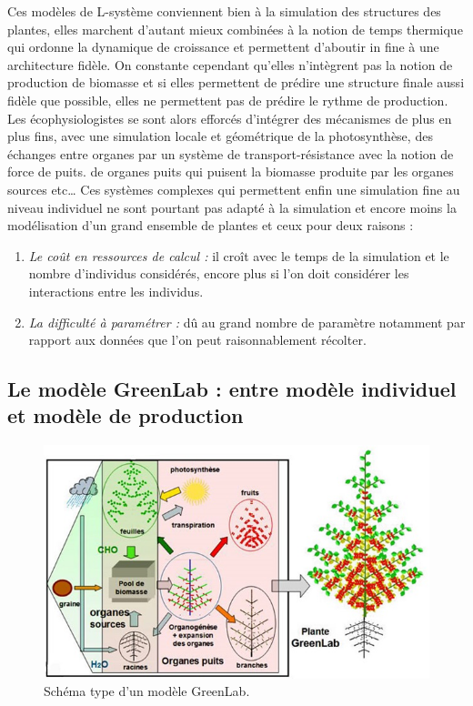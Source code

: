 {Ces modèles de L-système conviennent bien à la simulation des structures des
plantes, elles marchent d’autant mieux combinées à la notion de temps
thermique qui ordonne la dynamique de croissance et permettent d’aboutir 
in fine à une architecture fidèle. On constante cependant
qu'elles n’intègrent pas la notion de
production de biomasse et si elles permettent de prédire une structure
finale aussi fidèle que possible, elles ne permettent pas de prédire le
rythme de production. Les écophysiologistes se sont alors efforcés
d’intégrer des mécanismes de plus en plus fins, avec une simulation locale
et géométrique de la photosynthèse, des échanges entre organes par un
système de transport-résistance avec la notion de force de puits. de organes
puits qui puisent la biomasse produite par les organes sources etc… 
Ces systèmes complexes qui permettent enfin une simulation fine au niveau
individuel ne sont pourtant pas adapté à la simulation et encore moins la modélisation d’un grand ensemble de plantes et ceux pour deux raisons : 
\begin{enumerate}
\item \emph{Le coût en ressources de calcul :} il croît avec le temps de la simulation et le nombre d’individus considérés, encore plus si l’on doit considérer les interactions entre les individus.
\item \emph{La difficulté à paramétrer :} dû au grand nombre de paramètre notamment par rapport aux données que l’on peut raisonnablement récolter.
\end{enumerate}

\subsection[Le modèle GreenLab]{Le modèle GreenLab : entre modèle individuel et modèle de production}

\begin{figure}[h]
	\begin{center}
  \includegraphics[scale=1]{./img/sGL.jpg}
  \caption{Schéma type d'un modèle GreenLab.}
  \label{fig:schemaGL}
  \end{center}
\end{figure}

}
